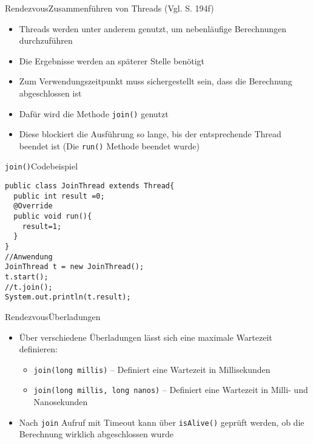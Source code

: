\begin{frame}{Rendezvous}{Zusammenführen von Threads (Vgl. \cite{ullenboom2014java} S. 194f)}
    \begin{itemize}
        \item Threads werden unter anderem genutzt, um nebenläufige Berechnungen durchzuführen
        \item Die Ergebnisse werden an späterer Stelle benötigt
        \item Zum Verwendungszeitpunkt muss sichergestellt sein, dass die Berechnung abgeschlossen ist
        \item Dafür wird die Methode \texttt{join()} genutzt
        \item Diese blockiert die Ausführung so lange, bis der entsprechende Thread beendet ist (Die \texttt{run()} Methode beendet wurde)
    \end{itemize}
\end{frame}

\begin{frame}[fragile]{\texttt{join()}}{Codebeispiel}
\lstset{style=java}
\begin{lstlisting}
public class JoinThread extends Thread{
  public int result =0;
  @Override
  public void run(){
    result=1;
  }
}
//Anwendung
JoinThread t = new JoinThread();
t.start();
//t.join();
System.out.println(t.result);
\end{lstlisting}
\end{frame}

\begin{frame}{Rendezvous}{Überladungen}
    \begin{itemize}
        \item Über verschiedene Überladungen lässt sich eine maximale Wartezeit definieren:
        \begin{itemize}
            \item \texttt{join(long millis)} -- Definiert eine Wartezeit in Millisekunden
            \item \texttt{join(long millis, long nanos)} -- Definiert eine Wartezeit in Milli- und Nanosekunden
        \end{itemize}
        \item Nach \texttt{join} Aufruf mit Timeout kann über \texttt{isAlive()} geprüft werden, ob die Berechnung wirklich abgeschlossen wurde
    \end{itemize}
\end{frame}